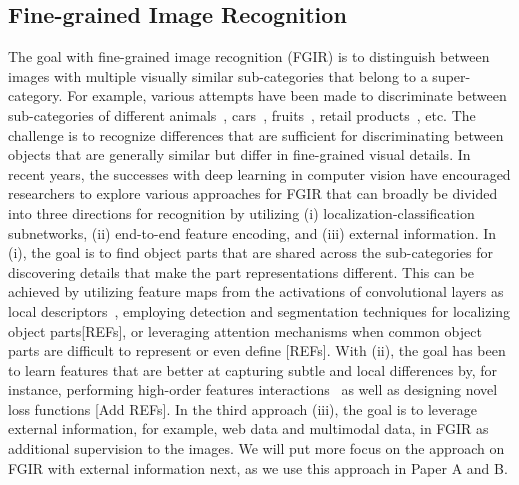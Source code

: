 \subsection{Fine-grained Image Recognition}
The goal with fine-grained image recognition (FGIR) is to distinguish between images with multiple visually similar sub-categories that belong to a super-category. For example, various attempts have been made to discriminate between sub-categories of different animals~\cite{van2018inaturalist}, cars~\cite{krause2013stanford_cars}, fruits~\cite{hou2017vegfru}, retail products~\cite{wei2019rpc}, etc. The challenge is to recognize differences that are sufficient for discriminating between objects that are generally similar but differ in fine-grained visual details. In recent years, the successes with deep learning in computer vision have encouraged researchers to explore various approaches for FGIR that can broadly be divided into three directions for recognition by utilizing (i) localization-classification subnetworks, (ii) end-to-end feature encoding, and (iii) external information. In (i), the goal is to find object parts that are shared across the sub-categories for discovering details that make the part representations different. This can be achieved by utilizing feature maps from the activations of convolutional layers as local descriptors~\cite{zhang2016picking, wang2018learning, ding2019selective}, employing detection and segmentation techniques for localizing object parts[REFs], or leveraging attention mechanisms when common object parts are difficult to represent or even define [REFs]. With (ii), the goal has been to learn features that are better at capturing subtle and local differences by, for instance, performing high-order features interactions~\cite{lin2015bilinear} as well as designing novel loss functions [Add REFs]. In the third approach (iii), the goal is to leverage external information, for example, web data and multimodal data, in FGIR as additional supervision to the images. We will put more focus on the approach on FGIR with external information next, as we use this approach in Paper A and B. 

